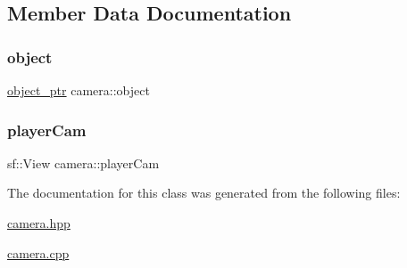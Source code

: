 \subsection{Member Data Documentation}
\mbox{\label{classcamera_a2f634677bff4e01829c2b7023e302d5b}} 
\subsubsection{\texorpdfstring{object}{object}}
{\footnotesize\ttfamily \hyperlink{drawable_8hpp_aab5add95f06d2ba25dbfed8eb07274fa}{object\+\_\+ptr} camera\+::object\hspace{0.3cm}{\ttfamily [private]}}

\mbox{\label{classcamera_a1ecd39044bc4cfde95854bb5c3390440}} 
\subsubsection{\texorpdfstring{player\+Cam}{playerCam}}
{\footnotesize\ttfamily sf\+::\+View camera\+::player\+Cam\hspace{0.3cm}{\ttfamily [private]}}



The documentation for this class was generated from the following files\+:\begin{DoxyCompactItemize}
\item 
\hyperlink{camera_8hpp}{camera.\+hpp}\item 
\hyperlink{camera_8cpp}{camera.\+cpp}\end{DoxyCompactItemize}

